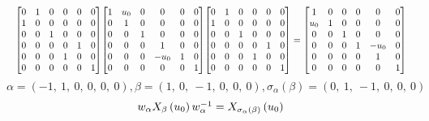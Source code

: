 \documentclass[11pt]{article}
\theoremstyle{definition}
\begin{document}
\[
\scaletoalign{\textwidth}{{\left[\begin{matrix}0 & 1 & 0 & 0 & 0 & 0\\1 & 0 & 0 & 0 & 0 & 0\\0 & 0 & 1 & 0 & 0 & 0\\0 & 0 & 0 & 0 & 1 & 0\\0 & 0 & 0 & 1 & 0 & 0\\0 & 0 & 0 & 0 & 0 & 1\end{matrix}\right]} {\left[\begin{matrix}1 & u_{0} & 0 & 0 & 0 & 0\\0 & 1 & 0 & 0 & 0 & 0\\0 & 0 & 1 & 0 & 0 & 0\\0 & 0 & 0 & 1 & 0 & 0\\0 & 0 & 0 & - u_{0} & 1 & 0\\0 & 0 & 0 & 0 & 0 & 1\end{matrix}\right]} {\left[\begin{matrix}0 & 1 & 0 & 0 & 0 & 0\\1 & 0 & 0 & 0 & 0 & 0\\0 & 0 & 1 & 0 & 0 & 0\\0 & 0 & 0 & 0 & 1 & 0\\0 & 0 & 0 & 1 & 0 & 0\\0 & 0 & 0 & 0 & 0 & 1\end{matrix}\right]} = {\left[\begin{matrix}1 & 0 & 0 & 0 & 0 & 0\\u_{0} & 1 & 0 & 0 & 0 & 0\\0 & 0 & 1 & 0 & 0 & 0\\0 & 0 & 0 & 1 & - u_{0} & 0\\0 & 0 & 0 & 0 & 1 & 0\\0 & 0 & 0 & 0 & 0 & 1\end{matrix}\right]}}
\]
\[
\alpha = \left( -1, \  1, \  0, \  0, \  0, \  0\right), \beta = \left( 1, \  0, \  -1, \  0, \  0, \  0\right), \sigma_{\alpha}(\beta) = \left( 0, \  1, \  -1, \  0, \  0, \  0\right)
\]
\[
\scaletoalign{\textwidth}{w_{\alpha} X_{\beta}\left(u_{0}\right) w_{\alpha}^{-1} = X_{\sigma_{\alpha}\left(\beta\right)}\left(u_{0}\right)}
\]
\end{document}
